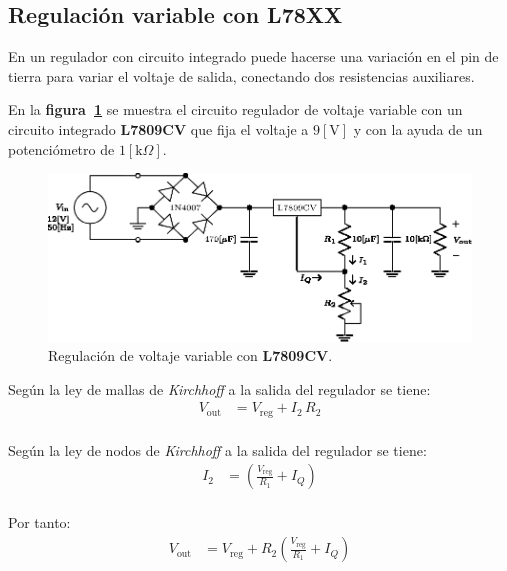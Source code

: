\subsection{Regulación variable con L78XX}
En un regulador con circuito integrado puede hacerse una variación en el pin de
tierra para variar el voltaje de salida, conectando dos resistencias
auxiliares.

En la \textbf{figura~\ref{circuito11}} se muestra el circuito regulador de
voltaje variable con un circuito integrado \textbf{L7809CV} que fija el voltaje
a $9[\text{V}]$ y con la ayuda de un potenciómetro de $1[\text{k}\Omega]$.

\begin{figure}[!h]
\centering
\includegraphics[scale=1.1]{diagramas/12.regulador4.eps}
\caption{Regulación de voltaje variable con \textbf{L7809CV}.}
\label{circuito11}
\end{figure}

Según la ley de mallas de \emph{Kirchhoff} a la salida del regulador se tiene:
\begin{equation*}
    \begin{split}
        V_{\text{out}} &= V_{\text{reg}} + I_2\,R_2\\
    \end{split}
\end{equation*}

Según la ley de nodos de \emph{Kirchhoff} a la salida del regulador se tiene:
\begin{equation*}
    \begin{split}
        I_2 &= \left(\frac{V_{\text{reg}}}{R_1} + I_Q\right)\\
    \end{split}
\end{equation*}

Por tanto:
\begin{equation*}
    \begin{split}
        V_{\text{out}} &= V_{\text{reg}} + R_2
        \left(\frac{V_{\text{reg}}}{R_1} + I_Q\right)\\
    \end{split}
\end{equation*}

